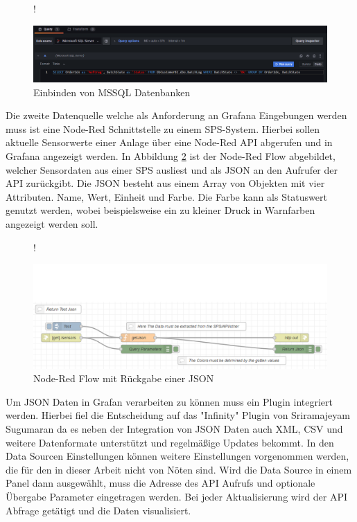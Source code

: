 \documentclass[a4paper, 12pt, oneside]{scrbook}
\begin{document}
	 	\begin{figure} [H]
	 		\centering
	 		\resizebox{\linewidth} {!} {
	 			\includegraphics{res/mssql_einbinden.png}
	 			
	 		}
	 		\caption{Einbinden von MSSQL Datenbanken}
	 		\label{fig:mssql_ein}
	 	\end{figure}
 	
 		\noindent Die zweite Datenquelle welche als Anforderung an Grafana Eingebungen werden muss ist eine Node-Red Schnittstelle zu einem SPS-System. Hierbei sollen aktuelle Sensorwerte einer Anlage über eine Node-Red API abgerufen und in Grafana angezeigt werden. In Abbildung \ref{fig:nodered} ist der Node-Red Flow abgebildet, welcher Sensordaten aus einer SPS ausliest und als JSON an den Aufrufer der API zurückgibt. Die JSON besteht aus einem Array von Objekten mit vier Attributen. Name, Wert, Einheit und Farbe. Die Farbe kann als Statuswert genutzt werden, wobei beispielsweise ein zu kleiner Druck in Warnfarben angezeigt werden soll. 
 		
 		
 		\begin{figure} [H]
 			\centering
 			\resizebox{\linewidth} {!} {
 				\includegraphics{res/nodered.png}
 				
 			}
 			\caption{Node-Red Flow mit Rückgabe einer JSON}
 			\label{fig:nodered}
 		\end{figure}
 	
	 	\noindent Um JSON Daten in Grafan verarbeiten zu können muss ein Plugin integriert werden. Hierbei fiel die Entscheidung auf das "Infinity" Plugin von Sriramajeyam Sugumaran da es neben der Integration von JSON Daten auch XML, CSV und weitere Datenformate unterstützt und regelmäßige Updates bekommt. In den Data Sourcen Einstellungen können weitere Einstellungen vorgenommen werden, die für den in dieser Arbeit nicht von Nöten sind. Wird die Data Source in einem Panel dann ausgewählt, muss die Adresse des API Aufrufs und optionale Übergabe Parameter eingetragen werden. Bei jeder Aktualisierung wird der API Abfrage getätigt und die Daten visualisiert. 
	 	
\end{document}
